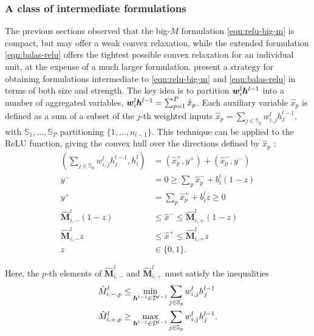 \subsubsection{A class of intermediate formulations}
The previous sections observed that the big-$M$ formulation \eqref{eqn:relu-big-m} is compact, but may offer a weak convex relaxation, while the extended formulation \eqref{eqn:balas-relu} offers the tightest possible convex relaxation for an individual unit, at the expense of a much larger formulation.
\cite{kronqvist2022psplit,kronqvist2021steps} present a strategy for obtaining formulations intermediate to \eqref{eqn:relu-big-m} and \eqref{eqn:balas-relu} in terms of both size and strength. 
The key idea is to partition ${\bm{w}}_i^l {\bm{h}}^{l-1}$ into a number of aggregated variables, ${\bm{w}}_i^l {\bm{h}}^{l-1} = \sum_{p=1}^P \hat{x}_p$. 
Each auxiliary variable $\hat{x}_p$ is defined as a sum of a subset of the $j$-th weighted inputs $\hat{x}_p = \sum_{j \in \mathbb{S}_p} w_{i,j}^l h_j^{l-1}$, with $\mathbb{S}_1, ..., \mathbb{S}_P$ partitioning $\{1,...,n_{l-1}\}$.  
This technique can be applied to the ReLU function, giving the convex hull over the directions defined by $\hat{x}_p$ \citep{tsay2021partition}: 
\begin{subequations} \label{eq:relu-partition}
\begin{align}
\left( \sum_{j \in \mathbb{S}_p} w_{i,j}^l h_j^{l-1},h^l_i \right) &= (\hat{x}_p^+,y^+) + (\hat{x}_p^-,y^-) \label{eq:Pextended1} \\
    y^- &= 0 \geq \sum_p \hat{x}_p^- + b^l_i(1-z) \\
    y^+ &= \sum_p \hat{x}_p^+ + b^l_iz \geq 0 \\
    \hat{\boldsymbol{M}}_{i,-}^l(1-z) &\leq \hat{x}^- \leq \hat{\boldsymbol{M}}_{i,+}^l(1-z) \\
    \hat{\boldsymbol{M}}_{i,-}^l z &\leq \hat{x}^+ \leq \hat{\boldsymbol{M}}_{i,+}^l z \\
    z &\in \{0,1\}. \label{eq:Pextended_1end}
\end{align}
\end{subequations}

Here, the $p$-th elements of $\hat{\boldsymbol{M}}_{i,-}^l$ and $\hat{\boldsymbol{M}}_{i,+}^l$ must satisfy the inequalities
\begin{align*}
    \hat{M}^l_{i,-,p} &\leq \min_{{\bm{h}}^{l-1} \in \mathcal{D}^{l-1}} \sum_{j \in \mathbb{S}_p} w_{i,j}^l h_j^{l-1} \\
    \hat{M}^l_{i,+,p} &\geq \max_{{\bm{h}}^{l-1} \in \mathcal{D}^{l-1}} \sum_{j \in \mathbb{S}_p} w_{i,j}^l h_j^{l-1}.
\end{align*}

